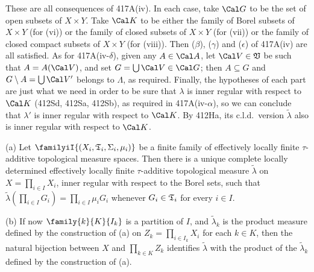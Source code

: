 { These are all consequences of 417A(iv).
In each case, take $\Cal G$ to be the set of open subsets of $X\times Y$.
Take $\Cal K$ to be either the family of Borel subsets of $X\times Y$
(for (vi)) or the family
of closed subsets of $X\times Y$ (for (vii)) or the family of closed
compact subsets of $X\times Y$ (for (viii)).   Then ($\beta$), ($\gamma$)
and ($\epsilon$) of 417A(iv) are all satisfied.
As for 417A(iv-$\delta$), given any $A\in\Cal A$, let $\Cal V\in\frak V$
be such that $A=A(\Cal V)$, and set $G=\bigcup\Cal V\in\Cal G$;  then
$A\subseteq G$ and $G\setminus A=\bigcup\Cal V'$ belongs to $\Lambda$, as
required.    Finally,
the hypotheses of each part are just what we need in
order to be sure that $\lambda$ is inner regular with respect to
$\Cal K$ (412Sd, 412Sa, 412Sb), as required in 417A(iv-$\alpha$), so we
can conclude that $\lambda'$ is inner regular with respect to $\Cal K$.
By 412Ha, its c.l.d.\ version
$\tilde\lambda$ also is inner regular with respect to $\Cal K$.
}%

 (a) Let
$\familyiI{(X_i,\frak T_i,\Sigma_i,\mu_i)}$ be a finite family of
effectively locally finite $\tau$-additive topological measure spaces.
Then there is a unique complete locally determined effectively locally
finite $\tau$-additive topological measure $\tilde\lambda$ on
$X=\prod_{i\in I}X_i$, inner regular with respect to the Borel sets,
such that
$\tilde\lambda(\prod_{i\in I}G_i)=\prod_{i\in I}\mu_iG_i$ whenever
$G_i\in\frak T_i$ for every $i\in I$.

(b) If now $\family{k}{K}{I_k}$ is a partition of $I$, and
$\tilde\lambda_k$ is the product measure defined by the construction of
(a) on $Z_k=\prod_{i\in I_k}X_i$ for each $k\in K$, then the natural
bijection between $X$ and $\prod_{k\in K}Z_k$ identifies $\tilde\lambda$
with the product of the $\tilde\lambda_k$ defined by the construction of
(a).

